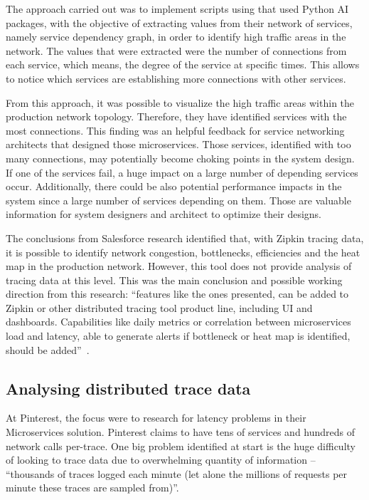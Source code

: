 The approach carried out was to implement scripts using that used Python AI packages, with the objective of extracting values from their network of services, namely service dependency graph, in order to identify high traffic areas in the network. The values that were extracted were the number of connections from each service, which means, the degree of the service at specific times. This allows to notice which services are establishing more connections with other services.

From this approach, it was possible to visualize the high traffic areas within the production network topology. Therefore, they have identified services with the most connections. This finding was an helpful feedback for service networking architects that designed those microservices. Those services, identified with too many connections, may potentially become choking points in the system design. If one of the services fail, a huge impact on a large number of depending services occur. Additionally, there could be also potential performance impacts in the system since a large number of services depending on them. Those are valuable information for system designers and architect to optimize their designs.

The conclusions from Salesforce research identified that, with Zipkin tracing data, it is possible to identify network congestion, bottlenecks, efficiencies and the heat map in the production network. However, this tool does not provide analysis of tracing data at this level. This was the main conclusion and possible working direction from this research: ``features like the ones presented, can be added to Zipkin or other distributed tracing tool product line, including UI and dashboards. Capabilities like daily metrics or correlation between microservices load and latency, able to generate alerts if bottleneck or heat map is identified, should be added''~\cite{anomaly_detection_zipkin_tracing_data}.

\subsection{Analysing distributed trace data}
\label{subsec:analysing_distributed_trace_data}

At Pinterest, the focus were to research for latency problems in their Microservices solution. Pinterest claims to have tens of services and hundreds of network calls per-trace. One big problem identified at start is the huge difficulty of looking to trace data due to overwhelming quantity of information -- ``thousands of traces logged each minute (let alone the millions of requests per minute these traces are sampled from)''.


